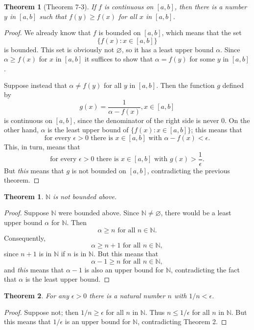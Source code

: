 \documentclass{article}
\newtheorem{theorem}{Theorem}
\newtheorem*{theorem*}{Theorem}
\begin{document}
\begin{theorem*}[Theorem 7-3]
  If $f$ is continuous on $[a, b]$, then there is a number $y$ in $[a, b]$ such
  that $f(y) \geq f(x)$ for all $x$ in $[a, b]$.
\end{theorem*}
\begin{proof}
  We already know that $f$ is bounded on $[a, b]$, which means that the set \[
    \{f(x): x \in [a, b]\}
  \] is bounded. This set is obviously not $\varnothing$, so it has a least
  upper bound $\alpha$. Since $\alpha \geq f(x)$ for $x$ in $[a, b]$ it
  suffices to show that $\alpha = f(y)$ for some $y$ in $[a, b]$.

  Suppose instead that $\alpha \neq f(y)$ for all $y$ in $[a, b]$. Then the
  function $g$ defined by \[
    g(x) = \frac{1}{\alpha - f(x)}, x \in [a, b]
  \] is continuous on $[a, b]$, since the denominator of the right side is
  never 0. On the other hand, $\alpha$ is the least upper bound of $\{f(x): x
  \in [a, b]\}$; this means that \[
    \text{for every } \epsilon > 0 \text{ there is } x \in [a, b] \text{ with }
    \alpha - f(x) < \epsilon.
  \] This, in turn, means that \[
    \text{for every } \epsilon > 0 \text{ there is } x \in [a, b] \text{ with }
    g(x) > \frac{1}{\epsilon}.
  \] But \emph{this} means that $g$ is not bounded on $[a, b]$, contradicting
  the previous theorem.
\end{proof}

\begin{theorem}
  $\mathbb{N}$ is not bounded above.
\end{theorem}
\begin{proof}
  Suppose $\mathbb{N}$ were bounded above. Since $\mathbb{N} \neq \varnothing$,
  there would be a least upper bound $\alpha$ for $\mathbb{N}$. Then \[
    \alpha \geq n \text{ for all } n \in \mathbb{N}.
  \] Consequently, \[
    \alpha \geq n + 1 \text{ for all } n \in \mathbb{N},
  \] since $n + 1$ is in $\mathbb{N}$ if $n$ is in $\mathbb{N}$. But this means
  that \[
    \alpha - 1 \geq n \text{ for all } n \in \mathbb{N},
  \] and \emph{this} means that $\alpha - 1$ is also an upper bound for
  $\mathbb{N}$, contradicting the fact that $\alpha$ is the least upper bound.
\end{proof}

\begin{theorem}
  For any $\epsilon > 0$ there is a natural number $n$ with $1/n < \epsilon$.
\end{theorem}
\begin{proof}
  Suppose not; then $1/n \geq \epsilon$ for all $n$ in $\mathbb{N}$. Thus $n
  \leq 1/\epsilon$ for all $n$ in $\mathbb{N}$. But this means that
  $1/\epsilon$ is an upper bound for $\mathbb{N}$, contradicting Theorem 2.
\end{proof}
\end{document}
